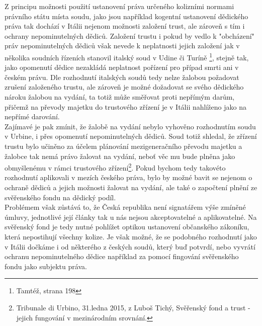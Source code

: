 \documentclass{article}
\begin{document}
Z principu možnosti použití ustanovení práva určeného kolizními normami právního státu místa soudu, jako jsou například kogentní ustanovení dědického práva tak dochází v Itálii nejenom možnosti založení trust, ale zároveň s tím i ochrany nepominutelných dědiců. Založení trustu i pokud by vedlo k "obcházení" práv nepominutelných dědiců však nevede k neplatnosti jejich založení jak v několika soudních řízeních stanovil italský soud v Udine či Turíně \footnote{Tamtéž, strana 198}, stejně tak, jako opomenutí dědice nezakládá neplatnost pořízení pro případ smrti ani v českém právu. Dle rozhodnutí italských soudů tedy nelze žalobou požadovat zrušení založeného trustu, ale zároveň je možné dožadovat se svého dědického nároku žalobou na vydání, ta totiž může směřovat proti nepřímým darům, přičemž na převody majetku do trustového zřízení je v Itálii nahlíženo jako na nepřímé darování.\\

Zajímavé je pak zmínit, že žalobě na vydání nebylo vyhověno rozhodnutím soudu v Urbine, i přes opomenutí nepominutelných dědiců. Soud totiž shledal, že zřízení trustu bylo učiněno za účelem plánování mezigeneračního převodu majetku a žalobce tak nemá právo žalovat na vydání, neboť věc mu bude plněna jako obmyšlenému v rámci trustového zřízení\footnote{Tribunale di Urbino, 31.ledna 2015, z Luboš Tichý, Svěřenský fond a trust - jejich fungování v mezinárodním srovnání.}. Pokud bychom tedy takovéto rozhodnutí aplikovali v mezích českého práva, bylo by možné bavit se nejenom o ochraně dědiců a jejich možnosti žalovat na vydání, ale také o započtení plnění ze svěřenského fondu na dědický podíl.\\

Problémem však zůstává to, že Česká republika není signatářem výše zmíněné úmluvy, jednotlivé její články tak u nás nejsou akceptovatelné a aplikovatelné. Na svěřenský fond je tedy nutné pohlížet optikou ustanovení občanského zákoníku, která nepostihují všechny kolize. Je však možné, že se podobného rozhodnutí jako v Itálii dočkáme i od některého z českých soudů, který buď potvrdí, nebo vyvrátí ochranu nepominutelného dědice například za pomocí fingování svěřenského fondu jako subjektu práva.\\

\end{document}
